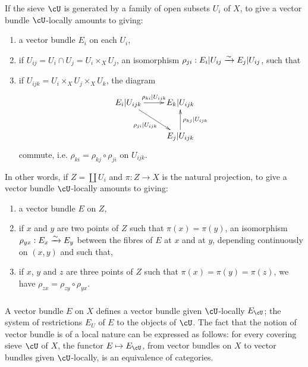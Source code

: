 If the sieve $\cU$ is generated by a family of open subsets $U_i$ of $X$, to
give a vector bundle $\cU$-locally amounts to giving:
\begin{enumerate}[\indent a)]
  \item a vector bundle $E_i$ on each $U_i$, 
  \item if $U_{ij} = U_i\cap U_j = U_i\times_X U_j$, an isomorphism 
    $\rho_{ji} : E_i|U_{ij} \xrightarrow\sim E_j|U_{ij}$, such that 
  \item if $U_{ijk} = U_i\times_X U_j\times_X U_k$, the diagram 
    \[\xymatrix{
      E_i |U_{ijk} \ar[r]^-{\rho_{ki}|U_{ijk}} \ar[dr]_-{\rho_{ji}|U_{ijk}} 
        & E_k|U_{ijk} \\
      & E_j|U_{ijk} \ar[u]_-{\rho_{kj}|U_{ijk}}
    }\]
    commute, i.e. $\rho_{ki} = \rho_{kj}\circ \rho_{ji}$ on
    $U_{ijk}$. 
\end{enumerate}

In other words, if $Z=\coprod U_i$ and $\pi:Z\to X$ is the natural
projection, to give a vector bundle $\cU$-locally amounts to giving: 
\begin{enumerate}[\indent a)]
  \item a vector bundle $E$ on $Z$, 
  \item if $x$ and $y$ are two points of $Z$ such that $\pi(x) = \pi(y)$, an
    isomorphism $\rho_{y x}:E_x\xrightarrow\sim E_y$ between the fibres of $E$ at $x$ and at
    $y$, depending continuously on $(x,y)$ and such that, 
  \item if $x$, $y$ and $z$ are three points of $Z$ such that 
  $\pi(x)=\pi(y)=\pi(z)$, we have $\rho_{zx} = \rho_{zy}\circ \rho_{yx}$. 
\end{enumerate}





\subsubsection{}\label{I:1-3-3}

A vector bundle $E$ on $X$ defines a vector bundle given
$\cU$-locally $E_\cU$; the system of restrictions $E_U$ of $E$ to the objects
of $\cU$. The fact that the notion of vector bundle is of a local nature can
be expressed as follows: for every covering sieve $\cU$ of $X$, the functor
$E\mapsto E_\cU$, from vector bundles on $X$ to vector bundles
given $\cU$-locally, is an equivalence of categories. 





